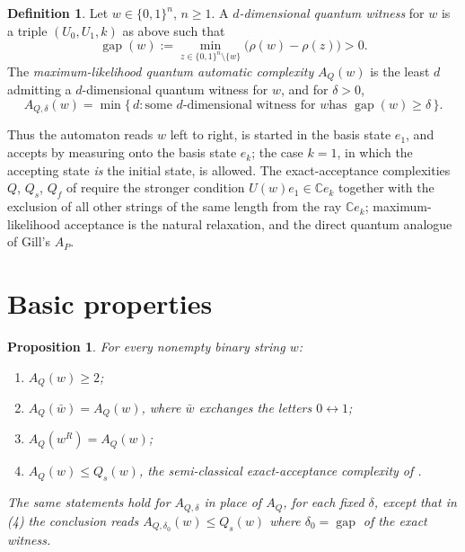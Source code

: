 \documentclass[11pt]{amsart}
\newtheorem{proposition}[theorem]{Proposition}
\theoremstyle{definition}
\newtheorem{definition}[theorem]{Definition}
\theoremstyle{remark}
\newcommand{\C}{\mathbb{C}}
\newcommand{\AQ}{A_Q}
\newcommand{\AP}{A_P}
\newcommand{\gapp}{\operatorname{gap}}
\begin{document}
\begin{definition}\label{def:AQ}
Let $w\in\{0,1\}^n$, $n\ge1$. A \emph{$d$-dimensional quantum witness}
for $w$ is a triple $(U_0,U_1,k)$ as above such that
\[
  \gapp(w):=\min_{z\in\{0,1\}^n\setminus\{w\}}
  \bigl(\rho(w)-\rho(z)\bigr)>0 .
\]
The \emph{maximum-likelihood quantum automatic complexity} $\AQ(w)$ is
the least $d$ admitting a $d$-dimensional quantum witness for $w$, and
for $\delta>0$,
\[
  A_{Q,\delta}(w)=\min\{\,d:\text{some $d$-dimensional witness for $w$
    has }\gapp(w)\ge\delta\,\}.
\]
\end{definition}

Thus the automaton reads $w$ left to right, is started in the basis
state $e_1$, and accepts by measuring onto the basis state $e_k$; the
case $k=1$, in which the accepting state \emph{is} the initial state,
is allowed. The exact-acceptance complexities $Q$, $Q_s$, $Q_f$ of
\cite{KH17} require the stronger condition $U(w)e_1\in\C e_k$ together
with the exclusion of all other strings of the same length from the
ray $\C e_k$; maximum-likelihood acceptance is the natural relaxation,
and the direct quantum analogue of Gill's $\AP$.

\section{Basic properties}\label{sec:basic}

\begin{proposition}\label{prop:basic}
For every nonempty binary string $w$:
\begin{enumerate}
\item $\AQ(w)\ge2$;
\item $\AQ(\bar w)=\AQ(w)$, where $\bar w$ exchanges the letters
  $0\leftrightarrow1$;
\item $\AQ(w^R)=\AQ(w)$;
\item $\AQ(w)\le Q_s(w)$, the semi-classical exact-acceptance
complexity of \cite{KH17}.
\end{enumerate}
The same statements hold for $A_{Q,\delta}$ in place of $\AQ$, for
each fixed $\delta$, except that in (4) the conclusion reads
$A_{Q,\delta_0}(w)\le Q_s(w)$ where
$\delta_0=\gapp$ of the exact witness.
\end{proposition}
\end{document}
